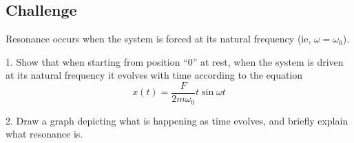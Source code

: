 \subsection*{Challenge}
Resonance occurs when the system is forced at its natural frequency (ie, $\omega = \omega_0$).

1. Show that when starting from position ``0'' at rest, when the system is driven at its natural frequency it evolves with time according to the equation
\begin{equation}
    x(t) = \frac{F}{2 m \omega_0} t \sin \omega t
\end{equation}

2. Draw a graph depicting what is happening as time evolves, and briefly explain what resonance is.
